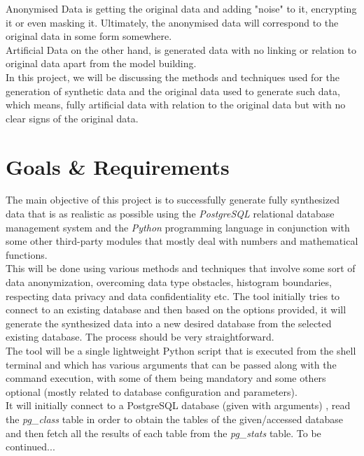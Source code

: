 Anonymised Data is getting the original data and adding "noise" to it, encrypting it or even masking it. Ultimately, the anonymised data will correspond to the original data in some form somewhere.\\
Artificial Data on the other hand, is generated data with no linking or relation to original data apart from the model building.\\
\newline
In this project, we will be discussing the methods and techniques used for the generation of synthetic data and the original data used to generate such data, which means, fully artificial data with relation to the original data but with no clear signs of the original data.
\section{Goals \& Requirements}
The main objective of this project is to successfully generate fully synthesized data that is as realistic as possible using the \textit{PostgreSQL} relational database management system and the \textit{Python} programming language in conjunction with some other third-party modules that mostly deal with numbers and mathematical functions.\\
\newline
This will be done using various methods and techniques that involve some sort of data anonymization, overcoming data type obstacles, histogram boundaries, respecting data privacy and data confidentiality etc. The tool initially tries to connect to an existing database and then based on the options provided, it will generate the synthesized data into a new desired database from the selected existing database. The process should be very straightforward.\\
\newline
The tool will be a single lightweight Python script that is executed from the shell terminal and which has various arguments that can be passed along with the command execution, with some of them being mandatory and some others optional (mostly related to database configuration and parameters).\\
It will initially connect to a PostgreSQL database (given with arguments) , read the \textit{pg\_class} table in order to obtain the tables of the given/accessed database and then fetch all the results of each table from the \textit{pg\_stats} table. 
To be continued...
